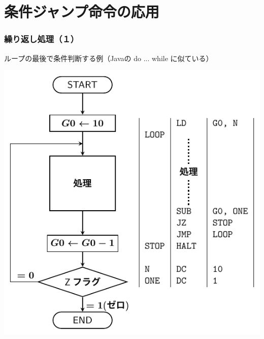 \documentclass{beamer}                 %
\begin{document}
\section{条件ジャンプ命令の応用}
\begin{frame}
  \frametitle{繰り返し処理（１）}
  ループの最後で条件判断する例（Javaの do ... while に似ている）\\
  \vfill
  \centerline{\includegraphics[scale=0.7]{../Tikz/flow2.pdf}}
  \vfill
\end{frame}
\end{document}
